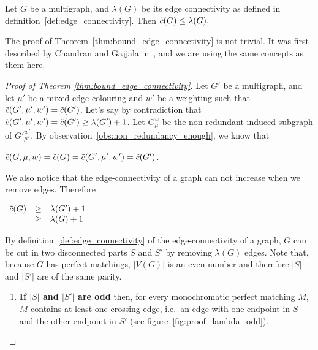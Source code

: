 \begin{theorem}
    \label{thm:bound_edge_connectivity}
    Let $G$ be a multigraph, and $\lambda(G)$ be its edge connectivity as defined in definition~\ref{def:edge_connectivity}.
    Then $\Tilde{c}(G) \leq \lambda(G).$
\end{theorem}

The proof of Theorem~\ref{thm:bound_edge_connectivity} is not trivial.
It was first described by Chandran and Gajjala in~\cite{chandran}, and we are using the same concepts as them here.


\begin{proof}[Proof of Theorem \ref{thm:bound_edge_connectivity}]
    Let $G'$ be a multigraph, and let $\mu'$ be a mixed-edge colouring and $w'$ be a weighting such that $\Tilde{c}(G', \mu', w') = \Tilde{c}(G')$.
    Let's say by contradiction that $\Tilde{c}(G', \mu', w') = \Tilde{c}(G') \geq \lambda(G') + 1$.
    Let $G_\mu^w$ be the non-redundant induced subgraph of ${G'}_{\mu'}^{w'}$.
    By observation~\ref{obs:non_redundancy_enough}, we know that
    
    \begin{center}
        $\Tilde{c}(G, \mu, w) = \Tilde{c}(G) = \Tilde{c}(G', \mu', w') = \Tilde{c}(G')$.
    \end{center}
    
    We also notice that the edge-connectivity of a graph can not increase when we remove edges.
    Therefore
    
    \begin{center}
        $\begin{array}{l c l}
            \Tilde{c}(G) & \geq & \lambda(G') + 1 \\
                         & \geq & \lambda(G) + 1 \\
        \end{array}$
    \end{center}
    
    By definition~\ref{def:edge_connectivity} of the edge-connectivity of a graph, $G$ can be cut in two disconnected parts $S$ and $S'$ by removing $\lambda(G)$ edges.
    Note that, because $G$ has perfect matchings, $|V(G)|$ is an even number and therefore $|S|$ and $|S'|$ are of the same parity.
    
    \begin{enumerate}
        \item 
            \textbf{If $|S|$ and $|S'|$ are odd} then, for every monochromatic perfect matching $M$, $M$ contains at least one crossing edge, i.e.\ an edge with one endpoint in $S$ and the other endpoint in $S'$ (see figure~\ref{fig:proof_lambda_odd}).
            

\end{enumerate}
\end{proof}
